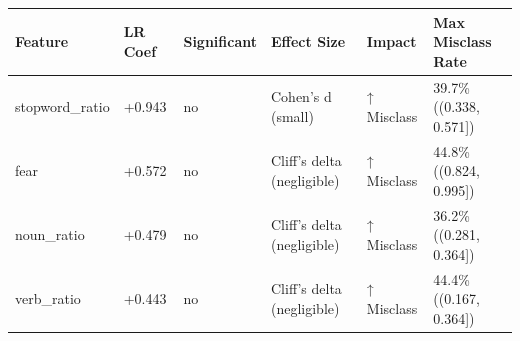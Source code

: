 \begin{tabular}{llllll}
\toprule
Feature & LR Coef & Significant & Effect Size & Impact & Max Misclass Rate \\
\midrule
stopword\_ratio & +0.943 & no & Cohen's d (small) & ↑ Misclass & 39.7\% ((0.338, 0.571]) \\
fear & +0.572 & no & Cliff's delta (negligible) & ↑ Misclass & 44.8\% ((0.824, 0.995]) \\
noun\_ratio & +0.479 & no & Cliff's delta (negligible) & ↑ Misclass & 36.2\% ((0.281, 0.364]) \\
verb\_ratio & +0.443 & no & Cliff's delta (negligible) & ↑ Misclass & 44.4\% ((0.167, 0.364]) \\
\bottomrule
\end{tabular}
